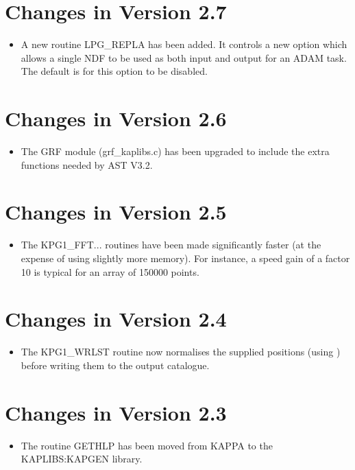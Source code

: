 \documentclass[11pt]{starlink}
\begin{document}
\section{Changes in Version 2.7}
\begin{itemize}
\item A new routine LPG\_REPLA has been added. It controls a new option
      which allows a single NDF to be used as both input and output for an
      ADAM task.  The default is for this option to be disabled.
\end{itemize}

\section{Changes in Version 2.6}
\begin{itemize}
\item The GRF module (grf\_kaplibs.c) has been upgraded to include the
      extra functions needed by AST V3.2.
\end{itemize}

\section{Changes in Version 2.5}
\begin{itemize}
\item The KPG1\_FFT... routines have been made significantly faster (at
      the expense of using slightly more memory). For instance, a speed gain
      of a factor 10 is typical for an array of 150000 points.
\end{itemize}

\section{Changes in Version 2.4}
\begin{itemize}
\item The KPG1\_WRLST routine now normalises the supplied positions (using
      ) before writing them to the output
      catalogue.
\end{itemize}

\section{Changes in Version 2.3}
\begin{itemize}
\item The routine GETHLP has been moved from KAPPA to the KAPLIBS:KAPGEN library.
\end{itemize}
\end{document}
